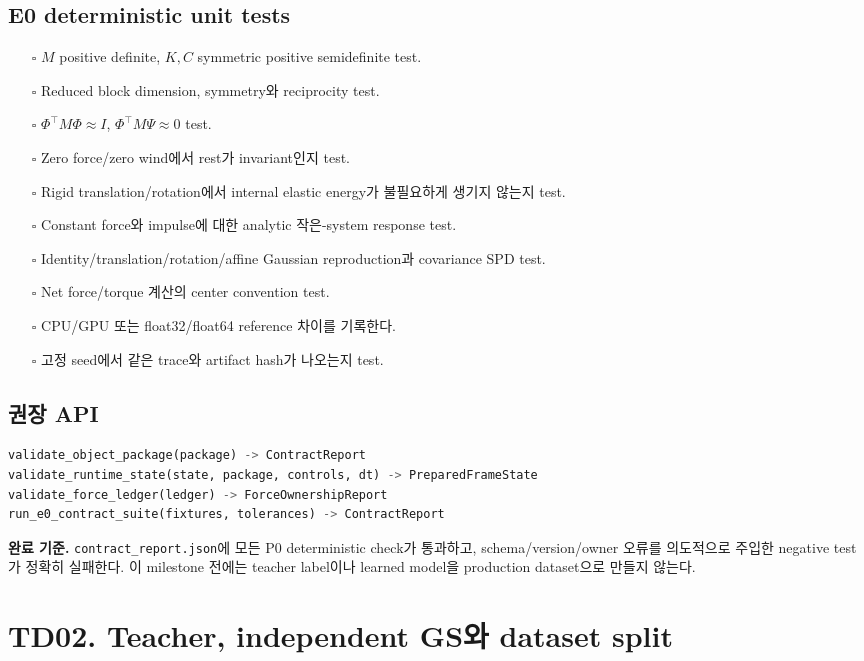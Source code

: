 \documentclass[10pt,a4paper]{article}
\newcommand{\todo}{\textcolor{TodoGray}{\(\square\)}}
\newcommand{\artifact}[1]{\textcolor{ProgressBlue}{\nolinkurl{#1}}}
\begin{document}
\subsection*{E0 deterministic unit tests}

\begin{itemize}
  \item[\todo] \(M\) positive definite, \(K,C\) symmetric positive semidefinite test.
  \item[\todo] Reduced block dimension, symmetry와 reciprocity test.
  \item[\todo] \(\Phi^\top M\Phi\approx I\), \(\Phi^\top M\Psi\approx0\) test.
  \item[\todo] Zero force/zero wind에서 rest가 invariant인지 test.
  \item[\todo] Rigid translation/rotation에서 internal elastic energy가 불필요하게 생기지 않는지 test.
  \item[\todo] Constant force와 impulse에 대한 analytic 작은-system response test.
  \item[\todo] Identity/translation/rotation/affine Gaussian reproduction과 covariance SPD test.
  \item[\todo] Net force/torque 계산의 center convention test.
  \item[\todo] CPU/GPU 또는 float32/float64 reference 차이를 기록한다.
  \item[\todo] 고정 seed에서 같은 trace와 artifact hash가 나오는지 test.
\end{itemize}

\subsection*{권장 API}

\begin{lstlisting}[language=Python]
validate_object_package(package) -> ContractReport
validate_runtime_state(state, package, controls, dt) -> PreparedFrameState
validate_force_ledger(ledger) -> ForceOwnershipReport
run_e0_contract_suite(fixtures, tolerances) -> ContractReport
\end{lstlisting}

\textbf{완료 기준.}
\artifact{contract_report.json}에 모든 P0 deterministic check가 통과하고,
schema/version/owner 오류를 의도적으로 주입한 negative test가 정확히 실패한다.
이 milestone 전에는 teacher label이나 learned model을 production dataset으로 만들지 않는다.

\section{TD02. Teacher, independent GS와 dataset split}
\end{document}
